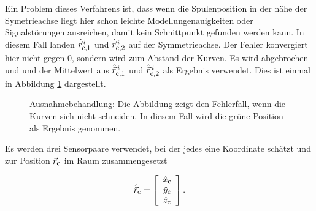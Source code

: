     Ein Problem dieses Verfahrens ist, dass wenn die Spulenposition in der nähe der Symetrieachse liegt hier schon leichte Modellungenauigkeiten oder Signalstörungen ausreichen, damit kein Schnittpunkt gefunden werden kann.  In diesem Fall landen $\hat{\vec{r}}_{\textrm{\footnotesize{c,1}}}^{\, i}$ und $\hat{\vec{r}}_{\textrm{\footnotesize{c,2}}}^{\, i}$ auf der Symmetrieachse. Der Fehler konvergiert hier nicht gegen 0, sondern wird zum Abstand der Kurven. Es wird abgebrochen und und der Mittelwert aus $\hat{\vec{r}}_{\textrm{\footnotesize{c,1}}}^{\, i}$ und $\hat{\vec{r}}_{\textrm{\footnotesize{c,2}}}^{\, i}$ als Ergebnis verwendet. Dies ist einmal in Abbildung \ref{fig:Exception} dargestellt.
    
    \begin{figure}
        \centering
        \caption{Ausnahmebehandlung: Die Abbildung zeigt den Fehlerfall, wenn die Kurven sich nicht schneiden. In diesem Fall wird die grüne Position als Ergebnis genommen.}
        \label{fig:Exception}
    \end{figure}

    
    Es werden drei Sensorpaare verwendet, bei der jedes eine Koordinate schätzt und zur Position $\vec{r}_{\textrm{\footnotesize{c}}}$ im Raum zusammengesetzt

    \begin{equation}
        \hat{\vec{r}}_{\textrm{\footnotesize{c}}} = \left[\begin{array}{c} \hat{x}_{\textrm{\footnotesize{c}}}\\ \hat{y}_{\textrm{\footnotesize{c}}} \\ \hat{z}_{\textrm{\footnotesize{c}}} \end{array}\right].
    \end{equation}

